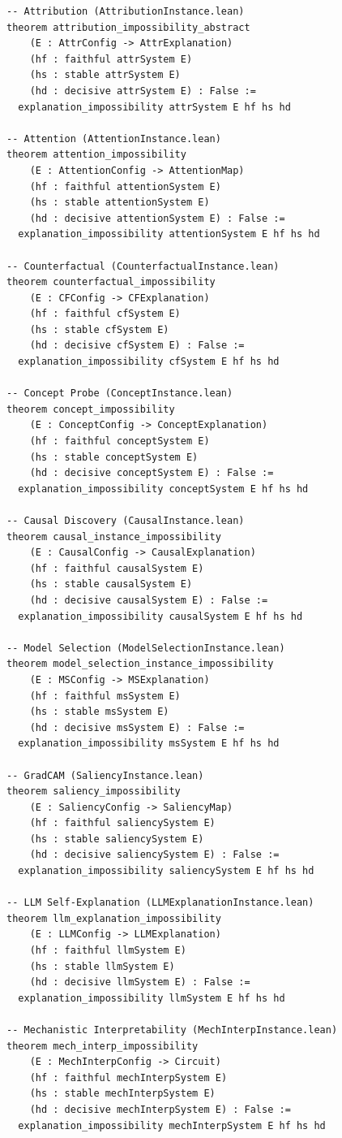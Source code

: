 \documentclass[11pt,a4paper]{article}
\begin{document}
\begin{lstlisting}[caption={Nine instance impossibility theorems}]
-- Attribution (AttributionInstance.lean)
theorem attribution_impossibility_abstract
    (E : AttrConfig -> AttrExplanation)
    (hf : faithful attrSystem E)
    (hs : stable attrSystem E)
    (hd : decisive attrSystem E) : False :=
  explanation_impossibility attrSystem E hf hs hd

-- Attention (AttentionInstance.lean)
theorem attention_impossibility
    (E : AttentionConfig -> AttentionMap)
    (hf : faithful attentionSystem E)
    (hs : stable attentionSystem E)
    (hd : decisive attentionSystem E) : False :=
  explanation_impossibility attentionSystem E hf hs hd

-- Counterfactual (CounterfactualInstance.lean)
theorem counterfactual_impossibility
    (E : CFConfig -> CFExplanation)
    (hf : faithful cfSystem E)
    (hs : stable cfSystem E)
    (hd : decisive cfSystem E) : False :=
  explanation_impossibility cfSystem E hf hs hd

-- Concept Probe (ConceptInstance.lean)
theorem concept_impossibility
    (E : ConceptConfig -> ConceptExplanation)
    (hf : faithful conceptSystem E)
    (hs : stable conceptSystem E)
    (hd : decisive conceptSystem E) : False :=
  explanation_impossibility conceptSystem E hf hs hd

-- Causal Discovery (CausalInstance.lean)
theorem causal_instance_impossibility
    (E : CausalConfig -> CausalExplanation)
    (hf : faithful causalSystem E)
    (hs : stable causalSystem E)
    (hd : decisive causalSystem E) : False :=
  explanation_impossibility causalSystem E hf hs hd

-- Model Selection (ModelSelectionInstance.lean)
theorem model_selection_instance_impossibility
    (E : MSConfig -> MSExplanation)
    (hf : faithful msSystem E)
    (hs : stable msSystem E)
    (hd : decisive msSystem E) : False :=
  explanation_impossibility msSystem E hf hs hd

-- GradCAM (SaliencyInstance.lean)
theorem saliency_impossibility
    (E : SaliencyConfig -> SaliencyMap)
    (hf : faithful saliencySystem E)
    (hs : stable saliencySystem E)
    (hd : decisive saliencySystem E) : False :=
  explanation_impossibility saliencySystem E hf hs hd

-- LLM Self-Explanation (LLMExplanationInstance.lean)
theorem llm_explanation_impossibility
    (E : LLMConfig -> LLMExplanation)
    (hf : faithful llmSystem E)
    (hs : stable llmSystem E)
    (hd : decisive llmSystem E) : False :=
  explanation_impossibility llmSystem E hf hs hd

-- Mechanistic Interpretability (MechInterpInstance.lean)
theorem mech_interp_impossibility
    (E : MechInterpConfig -> Circuit)
    (hf : faithful mechInterpSystem E)
    (hs : stable mechInterpSystem E)
    (hd : decisive mechInterpSystem E) : False :=
  explanation_impossibility mechInterpSystem E hf hs hd
\end{lstlisting}
\end{document}
